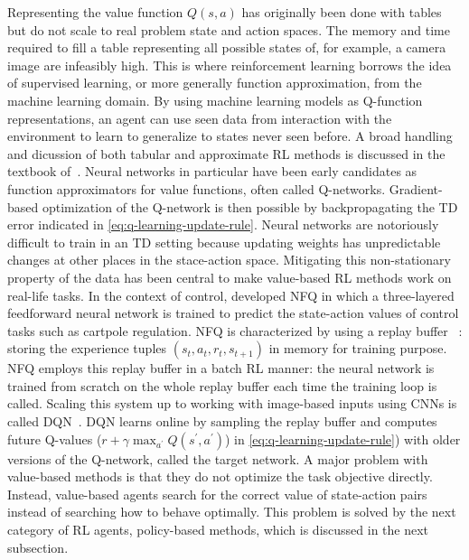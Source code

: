 \documentclass[\home/main.tex]{subfiles}
\begin{document}
Representing the value function $Q(s, a)$ has originally been done with tables~\autocite{watkins1992q} but do not scale to real problem state and action spaces. The memory and time required to fill a table representing all possible states of, for example, a camera image are infeasibly high. This is where reinforcement learning borrows the idea of supervised learning, or more generally function approximation, from the machine learning domain. By using machine learning models as Q-function representations, an agent can use seen data from interaction with the environment to learn to generalize to states never seen before. A broad handling and dicussion of both tabular and approximate RL methods is discussed in the textbook of~\textcite{Sutton2018}. Neural networks in particular have been early candidates as function approximators for value functions, often called Q-networks. Gradient-based optimization of the Q-network is then possible by backpropagating the TD error indicated in \cref{eq:q-learning-update-rule}. Neural networks are notoriously difficult to train in an TD setting because updating weights has unpredictable changes at other places in the stace-action space. Mitigating this non-stationary property of the data has been central to make value-based RL methods work on real-life tasks. In the context of control, \textcite{riedmiller2005neural} developed \gls{NFQ} in which a three-layered feedforward neural network is trained to predict the state-action values of control tasks such as cartpole regulation. \Gls{NFQ} is characterized by using a replay buffer ~\autocite{lin1992reinforcement}: storing the experience tuples $(s_t, a_t, r_t, s_{t+1})$ in memory for training purpose. \gls{NFQ} employs this replay buffer in a batch RL manner: the neural network is trained from scratch on the whole replay buffer each time the training loop is called. Scaling this system up to working with image-based inputs using \glspl{CNN} is called \gls{DQN}~\autocite{mnih2015human}. \Gls{DQN} learns online by sampling the replay buffer and computes future Q-values ($r+\gamma\max _{a^{\prime}} Q\left(s^{\prime}, a^{\prime}\right)$) in \cref{eq:q-learning-update-rule}) with older versions of the Q-network, called the target network. A major problem with value-based methods is that they do not optimize the task objective directly. Instead, value-based agents search for the correct value of state-action pairs instead of searching how to behave optimally. This problem is solved by the next category of RL agents, policy-based methods, which is discussed in the next subsection.
\end{document}
